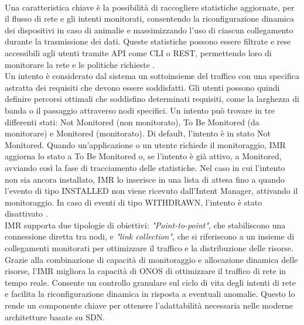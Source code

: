 \\Una caratteristica chiave è la possibilità di raccogliere statistiche aggiornate, per il flusso di rete e gli intenti monitorati, 
consentendo la riconfigurazione dinamica dei dispositivi in caso di animalie e massimizzando l'uso di ciascun collegamento durante la trasmissione dei dati.
Queste statistiche possono essere filtrate e rese accessibili agli utenti tramite API come CLI o REST, permettendo loro di monitorare la rete e le politiche richieste \cite{ONOSart}. 
\\Un intento è considerato dal sistema un sottoinsieme del traffico con una specifica astratta dei requisiti che devono essere soddisfatti.
Gli utenti possono quindi definire percorsi ottimali che soddisfino determinati requisiti, come la larghezza di banda o il passaggio attraverso nodi
specifici.
Un intento può trovare in tre differenti stati: Not Monitored (non monitorato), To Be Monitored (da monitorare) e Monitored (monitorato). 
Di default, l'intento è in stato Not Monitored. Quando un'applicazione o un utente richiede il monitoraggio, IMR aggiorna lo stato a To Be Monitored o, se l'intento è già attivo, a Monitored, avviando così la fase di tracciamento delle statistiche.
Nel caso in cui l'intento non sia ancora installato, IMR lo inserisce in una lista di attesa fino a quando l'evento di tipo INSTALLED non viene ricevuto dall'Intent Manager, attivando il monitoraggio.
In caso di eventi di tipo WITHDRAWN, l'intento è stato disattivato \cite{onosint}.
\\IMR supporta due tipologie di obiettivi: \textit{"Point-to-point"}, che stabiliscono una connessione diretta tra nodi, e 
\textit{"link collection"}, che si riferiscono a un insieme di collegamenti monitorati per ottimizzare il traffico e la distribuzione delle risorse.
Grazie alla combinazione di capacità di monitoraggio e allocazione dinamica delle risorse, l'IMR migliora la capacità di ONOS di ottimizzare il traffico di rete in tempo reale. Consente un controllo 
granulare sul ciclo di vita degli intenti di rete e facilita la riconfigurazione dinamica in risposta a eventuali anomalie.
Questo lo rende un componente chiave per ottenere l'adattabilità necessaria nelle moderne architetture basate su SDN.

